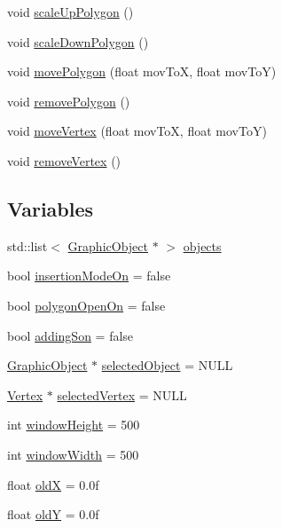 \begin{DoxyCompactItemize}
\item 
void \hyperlink{group___world_gab7bbc906d2ca9264069df173ff58e0d6}{scale\+Up\+Polygon} ()
\item 
void \hyperlink{group___world_gac9205e45b3ee73eddf1c55b7bd178d53}{scale\+Down\+Polygon} ()
\item 
void \hyperlink{group___world_ga97f4baefa997b2f2dd9bc0f3ddadc11f}{move\+Polygon} (float mov\+To\+X, float mov\+To\+Y)
\item 
void \hyperlink{group___world_gacaa47af18ec11f8adc42a185e1ec94b0}{remove\+Polygon} ()
\item 
void \hyperlink{group___world_ga18767a78f84889ff1939c8a71f6c846e}{move\+Vertex} (float mov\+To\+X, float mov\+To\+Y)
\item 
void \hyperlink{group___world_ga75b6b3c17a173f8a1c96d49c3342d915}{remove\+Vertex} ()
\end{DoxyCompactItemize}
\subsection*{Variables}
\begin{DoxyCompactItemize}
\item 
std\+::list$<$ \hyperlink{class_graphic_object}{Graphic\+Object} $\ast$ $>$ \hyperlink{group___world_ga487a015c0da59fa4bf352c364579937a}{objects}
\item 
bool \hyperlink{group___world_gaf4135d5d26b2f98538dc661cfc50736f}{insertion\+Mode\+On} = false
\item 
bool \hyperlink{group___world_ga9e0f70121f47c7b76983f4503d9e568c}{polygon\+Open\+On} = false
\item 
bool \hyperlink{group___world_ga8f24fd4b9cb0a0ec37c3047890140245}{adding\+Son} = false
\item 
\hyperlink{class_graphic_object}{Graphic\+Object} $\ast$ \hyperlink{group___world_ga46a409c7a0b8f22f142780e936c75159}{selected\+Object} = N\+U\+L\+L
\item 
\hyperlink{class_vertex}{Vertex} $\ast$ \hyperlink{group___world_ga7bc21ab50154f979a1a4193c1ff21ce8}{selected\+Vertex} = N\+U\+L\+L
\item 
int \hyperlink{group___world_gaf140802328ffe8a45749114b1c5a2056}{window\+Height} = 500
\item 
int \hyperlink{group___world_gaa61000540636bfdc4c9f27045ab84ce9}{window\+Width} = 500
\item 
float \hyperlink{group___world_gab71ed9ed9d554e0b59c5f3eea8a8b72c}{old\+X} = 0.\+0f
\item 
float \hyperlink{group___world_ga4a7acfaba7bfffa91fd66ff56629bfe5}{old\+Y} = 0.\+0f
\end{DoxyCompactItemize}


